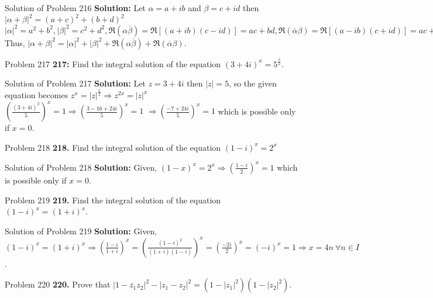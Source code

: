 \documentclass[aspectratio=169,8pt]{beamer}
\begin{document}
\begin{frame}{Solution of Problem 216}
  \textbf{Solution:} Let $\alpha = a + ib$ and $\beta = c + id$ then $|\alpha + \beta|^2 = (a + c)^2 + (b + d)^2$
  \\\vspace*{0.2cm}
  $|\alpha|^2 = a^2 + b^2, |\beta|^2 = c^2 + d^2, \Re(\alpha\overline{\beta}) = \Re[(a + ib)(c - id)] = ac + bd,
  \Re(\overline{\alpha}\beta) = \Re[(a - ib)(c + id)] = ac + bd$
  \\\vspace*{0.2cm}
  Thus, $|\alpha + \beta|^2 = |\alpha|^2 + |\beta|^2 + \Re(\alpha\overline{\beta}) + \Re(\overline{\alpha}\beta)$.
\end{frame}
\begin{frame}{Problem 217}
  \textbf{217:} Find the integral solution of the equation $(3 + 4i)^x = 5^{\frac{x}{2}}$.
\end{frame}
\begin{frame}{Solution of Problem 217}
  \textbf{Solution:} Let $z = 3 + 4i$ then $|z| = 5$, so the given equation becomes $z^x = |z|^{\frac{x}{2}} \Rightarrow z^{2x} =
  |z|^x$
  \\\vspace*{0.2cm}
  $\left(\frac{(3 + 4i)^2}{5}\right)^x = 1 \Rightarrow \left(\frac{3 - 16 + 24i}{5}\right)^x = 1$
  $\Rightarrow \left(\frac{-7 + 24i}{5}\right)^x = 1$ which is possible only if $x = 0$.
\end{frame}
\begin{frame}{Problem 218}
  \textbf{218.} Find the integral solution of the equation $(1 - i)^x = 2^x$
\end{frame}
\begin{frame}{Solution of Problem 218}
  \textbf{Solution:} Given, $(1 - x)^x = 2^x \Rightarrow \left(\frac{1 - i}{2}\right)^x = 1$ which is possible only if $x = 0$.
\end{frame}
\begin{frame}{Problem 219}
  \textbf{219.} Find the integral solution of the equation $(1 - i)^x = (1 + i)^x$.
\end{frame}
\begin{frame}{Solution of Problem 219}
  \textbf{Solution:} Given, $(1- i)^x = (1 + i)^x \Rightarrow \left(\frac{1 - i}{1 + i}\right)^x = \left(\frac{(1 - i)^2}{(1 + i)(1
    - i)}\right)^x = \left(\frac{-2i}{2}\right)^x = (-i)^x = 1 \Rightarrow x = 4n~\forall n\in I$.
\end{frame}
\begin{frame}{Problem 220}
  \textbf{220.} Prove that $|1 - \overline{z_1}z_2|^2 - |z_1 - z_2|^2 = (1 - |z_1|^2)(1 - |z_2|^2)$.
\end{frame}
\end{document}
